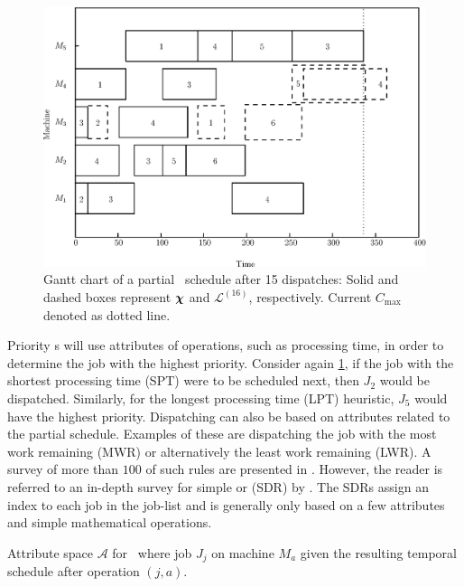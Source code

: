 \documentclass[twocolumn]{svjour3}
\begin{document}
\begin{figure}[t!]\centering
\includegraphics[width=\columnwidth]{figures/jssp_example}
\caption[Gantt chart of a partial \JSP\ schedule]{Gantt chart of a
partial \JSP\ schedule after 15 dispatches: Solid and dashed boxes
represent $\bm \chi$ and $\mathcal{L}^{(16)}$, respectively. Current
$C_{\max}$ denoted as dotted line.}
\label{fig:jssp:example}
\end{figure}


Priority \dr s will use attributes of operations, such as processing time, 
in order to determine the job with the highest priority. 
Consider again \cref{fig:jssp:example}, if the job with the shortest processing 
time (SPT) were to be scheduled next, then $J_2$ would be dispatched. 
Similarly, for the longest processing time (LPT) heuristic, $J_5$ would have 
the highest priority. 
Dispatching can also be based on attributes related to the partial schedule. 
Examples of these are dispatching the job with the most work remaining (MWR) or 
alternatively the least work remaining (LWR). A survey of more than $100$ of 
such rules are presented in \cite{Panwalkar77}. 
However, the reader is referred to an in-depth survey for simple or 
\emph{\sdr} (SDR) by \cite{Haupt89}. 
The SDRs assign an index to each job in the job-list and is generally only 
based on a few attributes and simple mathematical operations.

\begin{table}[t!] \centering
\caption[Attribute space $\mathcal{A}$ for \JSP]{Attribute space 
$\mathcal{A}$ for \JSP\ where job $J_j$ on machine $M_a$ given the 
resulting temporal schedule after operation $(j,a)$.
}
\label{tbl:jssp:feat}
{\setlength{\tabcolsep}{3pt} }
\end{table}
\end{document}
